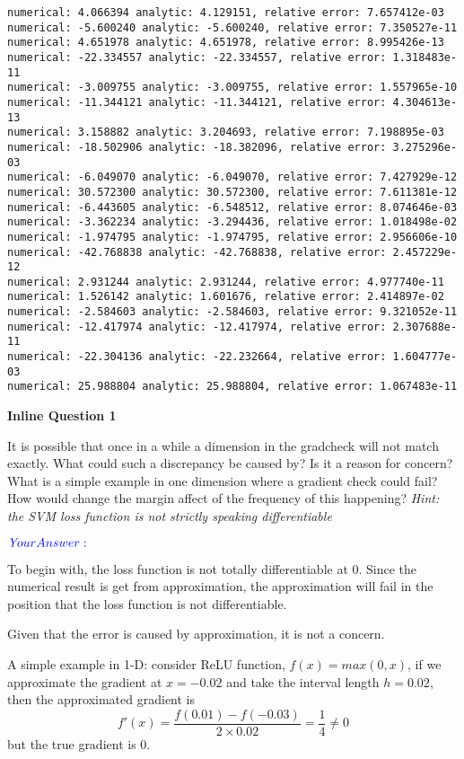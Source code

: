 \documentclass[11pt]{article}
\begin{document}
    \begin{Verbatim}[commandchars=\\\{\}]
numerical: 4.066394 analytic: 4.129151, relative error: 7.657412e-03
numerical: -5.600240 analytic: -5.600240, relative error: 7.350527e-11
numerical: 4.651978 analytic: 4.651978, relative error: 8.995426e-13
numerical: -22.334557 analytic: -22.334557, relative error: 1.318483e-11
numerical: -3.009755 analytic: -3.009755, relative error: 1.557965e-10
numerical: -11.344121 analytic: -11.344121, relative error: 4.304613e-13
numerical: 3.158882 analytic: 3.204693, relative error: 7.198895e-03
numerical: -18.502906 analytic: -18.382096, relative error: 3.275296e-03
numerical: -6.049070 analytic: -6.049070, relative error: 7.427929e-12
numerical: 30.572300 analytic: 30.572300, relative error: 7.611381e-12
numerical: -6.443605 analytic: -6.548512, relative error: 8.074646e-03
numerical: -3.362234 analytic: -3.294436, relative error: 1.018498e-02
numerical: -1.974795 analytic: -1.974795, relative error: 2.956606e-10
numerical: -42.768838 analytic: -42.768838, relative error: 2.457229e-12
numerical: 2.931244 analytic: 2.931244, relative error: 4.977740e-11
numerical: 1.526142 analytic: 1.601676, relative error: 2.414897e-02
numerical: -2.584603 analytic: -2.584603, relative error: 9.321052e-11
numerical: -12.417974 analytic: -12.417974, relative error: 2.307688e-11
numerical: -22.304136 analytic: -22.232664, relative error: 1.604777e-03
numerical: 25.988804 analytic: 25.988804, relative error: 1.067483e-11
    \end{Verbatim}

    \textbf{Inline Question 1}

It is possible that once in a while a dimension in the gradcheck will
not match exactly. What could such a discrepancy be caused by? Is it a
reason for concern? What is a simple example in one dimension where a
gradient check could fail? How would change the margin affect of the
frequency of this happening? \emph{Hint: the SVM loss function is not
strictly speaking differentiable}

\(\color{blue}{\textit Your Answer:}\)

To begin with, the loss function is not totally differentiable at \(0\).
Since the numerical result is get from approximation, the approximation
will fail in the position that the loss function is not differentiable.

Given that the error is caused by approximation, it is not a concern.

A simple example in 1-D: consider ReLU function, \(f(x) = max(0, x)\),
if we approximate the gradient at \(x = -0.02\) and take the interval
length \(h = 0.02\), then the approximated gradient is
\[f'(x) = \frac{f(0.01)-f(-0.03)}{2\times 0.02}=\frac{1}{4} \neq 0\] but
the true gradient is \(0\).
\end{document}
